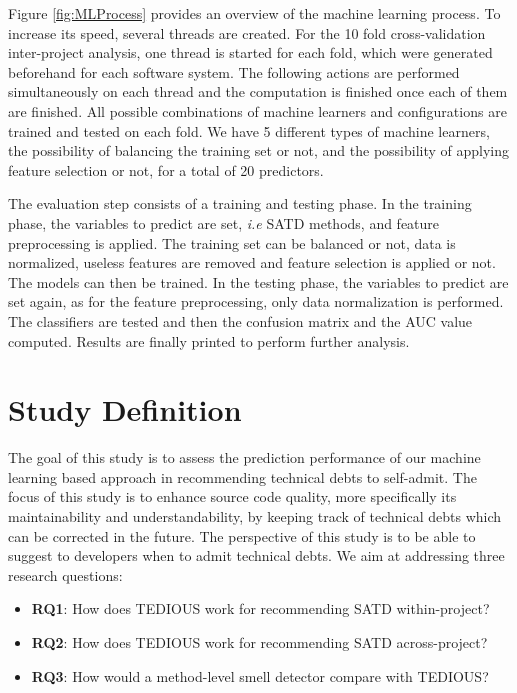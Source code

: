  
 Figure \ref{fig:MLProcess} provides an overview of the machine learning process. To increase its speed, several threads are created. For the 10 fold cross-validation inter-project analysis, one thread is started for each fold, which were generated beforehand for each software system. The following actions are performed simultaneously on each thread and the computation is finished once each of them are finished. All possible combinations of machine learners and configurations are trained and tested on each fold. We have 5 different types of machine learners, the possibility of balancing the training set or not, and the possibility of applying feature selection or not, for a total of 20 predictors. \par
 
 The evaluation step consists of a training and testing phase. In the training phase, the variables to predict are set, \emph{i.e} \ac{SATD} methods, and feature preprocessing is applied. The training set can be balanced or not, data is normalized, useless features are removed and feature selection is applied or not. The models can then be trained. In the testing phase, the variables to predict are set again, as for the feature preprocessing, only data normalization is performed. The classifiers are tested and then the confusion matrix and the AUC value computed. Results are finally printed to perform further analysis.
 
\section{Study Definition}


The goal of this study is to assess the prediction performance of our machine learning based approach in recommending technical debts to self-admit. The focus of this study is to enhance source code quality, more specifically its maintainability and understandability, by keeping track of technical debts which can be corrected in the future. The perspective of this study is to be able to suggest to developers when to admit technical debts. We aim at addressing three research questions:

\begin{itemize}
	\item \textbf{RQ1}: How does \ac{TEDIOUS} work for recommending \ac{SATD} within-project?
	\item \textbf{RQ2}: How does \ac{TEDIOUS} work for recommending \ac{SATD} across-project?
	\item \textbf{RQ3}: How would a method-level smell detector compare with \ac{TEDIOUS}?
\end{itemize}

